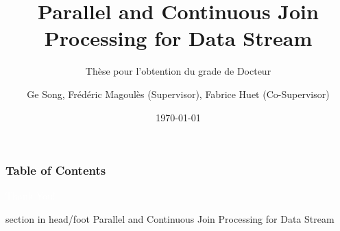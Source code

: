 \documentclass{beamer}
\title[Parallel and Continuous Join Processing for Data Stream]{Parallel and Continuous Join Processing for Data Stream}
\subtitle{Thèse pour l’obtention du grade de Docteur}
\author[G. Song, F. Magoulès, F. Huet]{
Ge Song, Frédéric Magoulès (Supervisor), Fabrice Huet (Co-Supervisor) }
\institute[CentraleSupélec]{
Lab MICS\\
  CentraleSupélec \\
  Université Paris-Saclay}
\date[\today]{
 \today}
\begin{document}
\begin{frame}
  \titlepage
\end{frame}

\begin{frame}
  \frametitle{Table of Contents}

  \tableofcontents
\end{frame}





%

\begin{frame}[plain, b]
\centering
\huge \textcolor{white}{Thank You!}
\normalsize

\vspace*{\fill}

 \begin{beamercolorbox}[wd=\paperwidth]{section in head/foot}
 \centering
Parallel and Continuous Join Processing for Data Stream
\vskip10pt
\end{beamercolorbox}
 \end{frame}
\end{document}
